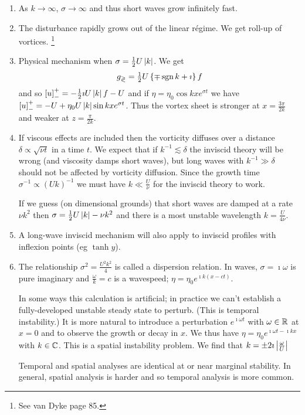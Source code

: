 \documentclass{notes}
\theoremstyle{plain}
\begin{document}
\begin{enumerate}
\item As $k \to \infty$, $\sigma \to \infty$ and thus short waves grow
  infinitely fast.
\item The disturbance rapidly grows out of the linear r\'egime.  We
get roll-up of vortices.%
\footnote{See van Dyke page 85.}
\item Physical mechanism when $\sigma = \tfrac{1}{2} U \left|k\right|$.  We
  get
\[
g_\gtrless = \tfrac{1}{2} U \left\{ \mp \operatorname{sgn} k + \imath \right\} f
\]
and so $\left[ u \right]_-^+ = -\tfrac{1}{2} \imath U \left|k\right| f - U$
and if $\eta = \eta_0 \cos k x e^{\sigma t}$ we have $\left[ u
\right]_-^+ = -U + \eta_0 U \left|k\right| \sin k x e^{\sigma t}$.  Thus the
vortex sheet is stronger at $x = \frac{3 \pi}{2 k}$ and weaker at $z =
\frac{\pi}{2 k}$.

\vspace{1.5in}

\item If viscous effects are included then the vorticity diffuses over
  a distance $\delta \propto \sqrt{\nu t}$ in a time $t$.  We expect
  that if $k^{-1} \lesssim \delta$ the inviscid theory will be wrong
  (and viscosity damps short waves), but long waves with $k^{-1} \gg
  \delta$ should not be affected by vorticity diffusion.  Since the
  growth time $\sigma^{-1} \propto \left( U k \right)^{-1}$ we must
  have $k \ll \frac{U}{\nu}$ for the inviscid theory to work.
  
  If we guess (on dimensional grounds) that short waves are damped at
  a rate $\nu k^2$ then $\sigma = \tfrac{1}{2} U \left|k\right| - \nu k^2$
  and there is a most unstable wavelength $k = \frac{U}{4 \nu}$.

  \vspace{1in}
  
\item A long-wave inviscid mechanism will also apply to inviscid
  profiles with inflexion points (eg $\tanh y$).
  
\item The relationship $\sigma^2 = \frac{U^2 k^2}{4}$ is called a
  dispersion relation.  In waves, $\sigma = \imath \omega$ is pure
  imaginary and $\frac{\omega}{k} = c$ is a wavespeed; $\eta = \eta_0
  e^{\imath k \left( x - c t \right)}$.
  
  In some ways this calculation is artificial; in practice we can't
  establish a fully-developed unstable steady state to perturb. (This
  is temporal instability.)  It is more natural to introduce a
  perturbation $e^{\imath \omega t}$ with $\omega \in \mathbb{R}$ at $x = 0$
  and to observe the growth or decay in $x$.  We thus have $\eta =
  \eta_0 e^{\imath \omega t - \imath k x}$ with $k \in \mathbb{C}$.  This is a
  spatial instability problem.  We find that $k = \pm 2 \imath
  \left|\frac{\omega}{U}\right|$

  Temporal and spatial analyses are identical at or near marginal stability.
  In general, spatial analysis is harder and so temporal analysis is more
  common.
\end{enumerate}
\end{document}
